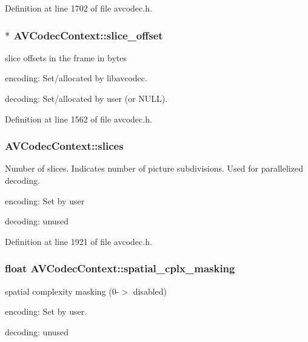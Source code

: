 Definition at line 1702 of file avcodec.\+h.

\subsubsection[{\texorpdfstring{slice\+\_\+offset}{slice_offset}}]{$\ast$ A\+V\+Codec\+Context\+::slice\+\_\+offset}\hypertarget{struct_a_v_codec_context_aedd75624ca647d2ac04b20c1eb7352e6}{}\label{struct_a_v_codec_context_aedd75624ca647d2ac04b20c1eb7352e6}
slice offsets in the frame in bytes
\begin{DoxyItemize}
\item encoding\+: Set/allocated by libavcodec.
\item decoding\+: Set/allocated by user (or N\+U\+LL). 
\end{DoxyItemize}

Definition at line 1562 of file avcodec.\+h.

\subsubsection[{\texorpdfstring{slices}{slices}}]{ A\+V\+Codec\+Context\+::slices}\hypertarget{struct_a_v_codec_context_aff4e6a78c0f08be43879644632e04b24}{}\label{struct_a_v_codec_context_aff4e6a78c0f08be43879644632e04b24}
Number of slices. Indicates number of picture subdivisions. Used for parallelized decoding.
\begin{DoxyItemize}
\item encoding\+: Set by user
\item decoding\+: unused 
\end{DoxyItemize}

Definition at line 1921 of file avcodec.\+h.

\subsubsection[{\texorpdfstring{spatial\+\_\+cplx\+\_\+masking}{spatial_cplx_masking}}]{\setlength{\rightskip}{0pt plus 5cm}float A\+V\+Codec\+Context\+::spatial\+\_\+cplx\+\_\+masking}\hypertarget{struct_a_v_codec_context_af79ff5dc9b33e370267f406dd2d5dc67}{}\label{struct_a_v_codec_context_af79ff5dc9b33e370267f406dd2d5dc67}
spatial complexity masking (0-\/$>$ disabled)
\begin{DoxyItemize}
\item encoding\+: Set by user.
\item decoding\+: unused 
\end{DoxyItemize}

